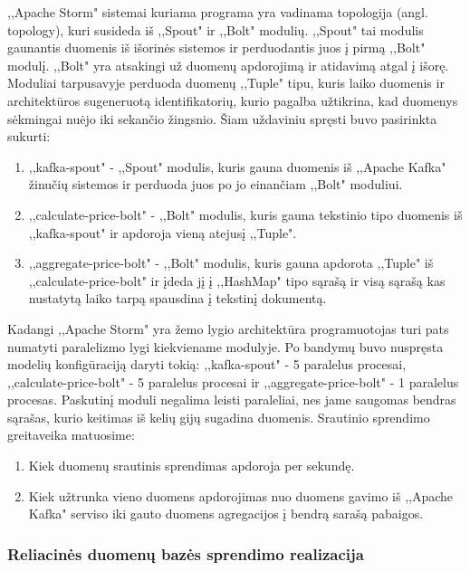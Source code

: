 \documentclass{VUMIFPSkursinis}
\begin{document}
,,Apache Storm" sistemai kuriama programa yra vadinama topologija (angl. topology), kuri susideda iš ,,Spout" ir ,,Bolt" modulių. ,,Spout" tai modulis gaunantis duomenis
iš išorinės sistemos ir perduodantis juos į pirmą ,,Bolt" modulį. ,,Bolt" yra atsakingi už duomenų apdorojimą ir atidavimą atgal į išorę.
Moduliai tarpusavyje perduoda duomenų ,,Tuple" tipu, kuris laiko duomenis ir architektūros sugeneruotą identifikatorių, 
kurio pagalba užtikrina, kad duomenys sėkmingai nuėjo iki sekančio žingsnio. 
Šiam uždaviniu spręsti buvo pasirinkta sukurti:
\begin{enumerate}
    \item ,,kafka-spout" - ,,Spout" modulis, kuris gauna duomenis iš ,,Apache Kafka" žinučių sistemos ir perduoda juos po jo einančiam ,,Bolt" moduliui.
    \item ,,calculate-price-bolt" - ,,Bolt" modulis, kuris gauna tekstinio tipo duomenis iš ,,kafka-spout" ir apdoroja vieną atejusį ,,Tuple".
    \item ,,aggregate-price-bolt" - ,,Bolt" modulis, kuris gauna apdorota ,,Tuple" iš ,,calculate-price-bolt" ir įdeda jį į ,,HashMap" tipo sąrašą ir visą sąrašą kas nustatytą laiko tarpą spausdina į tekstinį dokumentą.  
\end{enumerate}\par
Kadangi ,,Apache Storm" yra žemo lygio architektūra programuotojas turi pats numatyti paralelizmo lygi kiekviename modulyje. 
Po bandymų buvo nuspręsta modelių konfigūraciją daryti tokią: ,,kafka-spout" - 5 paralelus procesai, ,,calculate-price-bolt"
 - 5 paralelus procesai ir ,,aggregate-price-bolt" - 1 paralelus procesas. Paskutinį moduli negalima leisti paraleliai, nes jame saugomas bendras sąrašas,
kurio keitimas iš kelių gijų sugadina duomenis. Srautinio sprendimo greitaveika matuosime:
\begin{enumerate}
    \item Kiek duomenų srautinis sprendimas apdoroja per sekundę.
    \item Kiek užtrunka vieno duomens apdorojimas nuo duomens gavimo iš ,,Apache Kafka" serviso iki gauto duomens agregacijos į bendrą sarašą pabaigos.
\end{enumerate}

 \subsubsection{Reliacinės duomenų bazės sprendimo realizacija}
\end{document}
